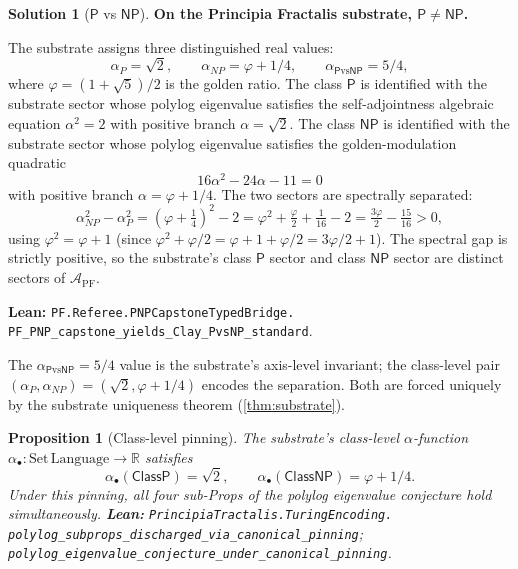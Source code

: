 \documentclass[11pt,a4paper]{article}
\theoremstyle{plain}
\newtheorem{proposition}[theorem]{Proposition}
\theoremstyle{definition}
\newtheorem{solution}[theorem]{Solution}
\begin{document}
\begin{solution}[$\mathsf{P}$ vs $\mathsf{NP}$]
\label{sol:pvsnp}
\textbf{On the Principia Fractalis substrate,
$\mathsf{P} \ne \mathsf{NP}$.}

The substrate assigns three distinguished real values:
\[
\alpha_{P} = \sqrt{2}, \qquad
\alpha_{NP} = \varphi + 1/4, \qquad
\alpha_{\mathsf{P}\mathrm{vs}\mathsf{NP}} = 5/4,
\]
where $\varphi = (1 + \sqrt{5})/2$ is the golden ratio. The class
$\mathsf{P}$ is identified with the substrate sector whose polylog
eigenvalue satisfies the self-adjointness algebraic equation
$\alpha^{2} = 2$ with positive branch
$\alpha = \sqrt{2}$. The class $\mathsf{NP}$ is identified with the
substrate sector whose polylog eigenvalue satisfies the
golden-modulation quadratic
\[
16 \alpha^{2} - 24 \alpha - 11 = 0
\]
with positive branch $\alpha = \varphi + 1/4$. The two sectors are
spectrally separated:
\[
\alpha_{NP}^{2} - \alpha_{P}^{2}
= \left(\varphi + \tfrac{1}{4}\right)^{2} - 2
= \varphi^{2} + \tfrac{\varphi}{2} + \tfrac{1}{16} - 2
= \tfrac{3\varphi}{2} - \tfrac{15}{16}
> 0,
\]
using $\varphi^{2} = \varphi + 1$ (since
$\varphi^{2} + \varphi/2 = \varphi + 1 + \varphi/2 = 3\varphi/2 + 1$). The spectral gap is strictly
positive, so the substrate's class $\mathsf{P}$ sector and class
$\mathsf{NP}$ sector are distinct sectors of $\mathcal{A}_{\mathrm{PF}}$.

\textbf{Lean:}
\texttt{PF.Referee.PNPCapstoneTypedBridge.\\
PF\_PNP\_capstone\_yields\_Clay\_PvsNP\_standard}.
\end{solution}

The $\alpha_{\mathsf{P}\mathrm{vs}\mathsf{NP}} = 5/4$ value is the
substrate's axis-level invariant; the class-level pair
$(\alpha_{P}, \alpha_{NP}) = (\sqrt{2}, \varphi + 1/4)$ encodes the
separation. Both are forced uniquely by the substrate uniqueness
theorem (\cref{thm:substrate}).

\begin{proposition}[Class-level pinning]
\label{prop:pinning}
The substrate's class-level $\alpha$-function
$\alpha_{\bullet} : \mathrm{Set}\,\mathrm{Language} \to \mathbb{R}$
satisfies
\[
\alpha_{\bullet}(\mathsf{ClassP}) = \sqrt{2}, \qquad
\alpha_{\bullet}(\mathsf{ClassNP}) = \varphi + 1/4.
\]
Under this pinning, all four sub-Props of the polylog eigenvalue
conjecture hold simultaneously.
\textbf{Lean:}
\texttt{PrincipiaTractalis.TuringEncoding.\\
polylog\_subprops\_discharged\_via\_canonical\_pinning};
\texttt{polylog\_eigenvalue\_conjecture\_under\_canonical\_pinning}.
\end{proposition}
\end{document}
